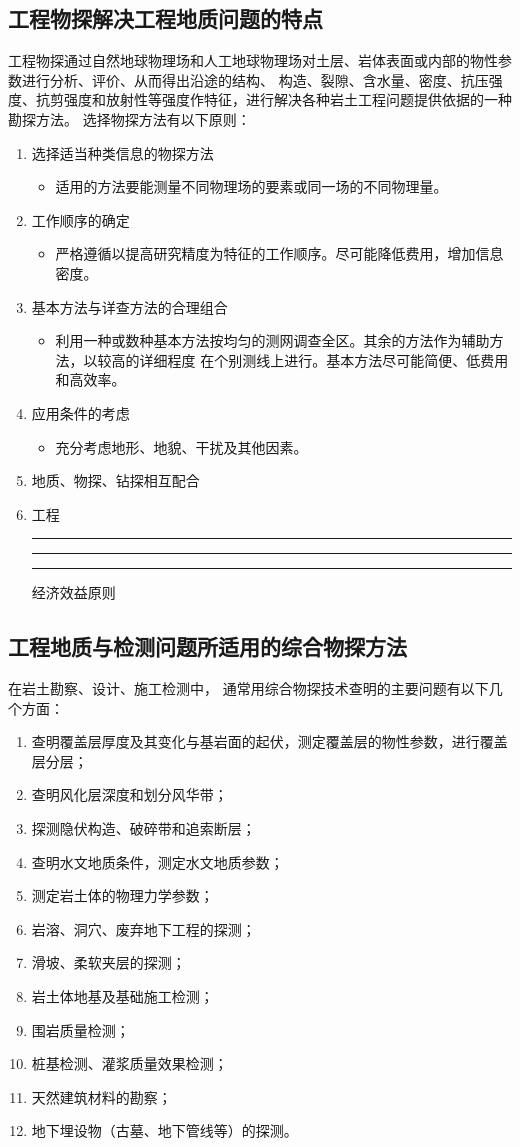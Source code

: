 \documentclass[hyperref,UTF-8]{ctexart}
\newcommand{\cndash}{\rule{0.2em}{0pt}\rule[0.35em]{1.6em}{0.05em}\rule{0.2em}{0pt}}
\begin{document}
\subsection{工程物探解决工程地质问题的特点}
工程物探通过自然地球物理场和人工地球物理场对土层、岩体表面或内部的物性参数进行分析、评价、从而得出沿途的结构、
构造、裂隙、含水量、密度、抗压强度、抗剪强度和放射性等强度作特征，进行解决各种岩土工程问题提供依据的一种勘探方法。
选择物探方法有以下原则：
\begin{enumerate}
\item 选择适当种类信息的物探方法
\begin{itemize}
\item 适用的方法要能测量不同物理场的要素或同一场的不同物理量。
\end{itemize}
\item 工作顺序的确定
\begin{itemize}
\item 严格遵循以提高研究精度为特征的工作顺序。尽可能降低费用，增加信息密度。
\end{itemize}
\item 基本方法与详查方法的合理组合
\begin{itemize}
\item 利用一种或数种基本方法按均匀的测网调查全区。其余的方法作为辅助方法，以较高的详细程度
在个别测线上进行。基本方法尽可能简便、低费用和高效率。
\end{itemize}
\item 应用条件的考虑
\begin{itemize}
\item 充分考虑地形、地貌、干扰及其他因素。
\end{itemize}
\item 地质、物探、钻探相互配合
\item 工程\cndash 经济效益原则
\end{enumerate}
\subsection{工程地质与检测问题所适用的综合物探方法}
在岩土勘察、设计、施工检测中，
通常用综合物探技术查明的主要问题有以下几个方面：
\begin{enumerate}
\item 查明覆盖层厚度及其变化与基岩面的起伏，测定覆盖层的物性参数，进行覆盖层分层；
\item 查明风化层深度和划分风华带；
\item 探测隐伏构造、破碎带和追索断层；
\item 查明水文地质条件，测定水文地质参数；
\item 测定岩土体的物理力学参数；
\item 岩溶、洞穴、废弃地下工程的探测；
\item 滑坡、柔软夹层的探测；
\item 岩土体地基及基础施工检测；
\item 围岩质量检测；
\item 桩基检测、灌浆质量效果检测；
\item 天然建筑材料的勘察；
\item 地下埋设物（古墓、地下管线等）的探测。
\end{enumerate}
\end{document}
